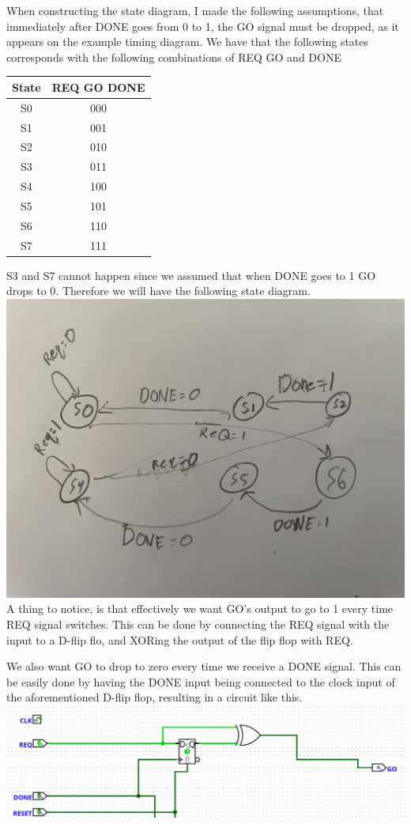 \documentclass[12pt]{article}
\begin{document}
When constructing the state diagram, I made the following assumptions,
that immediately after DONE goes from 0 to 1, the GO signal must be dropped,
as it appears on the example timing diagram. We have that the following states
corresponds with the following combinations of REQ GO and DONE \\
\begin{center}
    \begin{tabular}{c|c}
        State & REQ GO DONE\\
        \hline
        S0 & 000\\
\hline
S1 & 001\\
\hline
S2 & 010\\
\hline
S3 & 011\\
\hline
S4 & 100\\
\hline
S5 & 101\\
\hline
S6 & 110\\
\hline
S7 & 111\\
\hline
    \end{tabular}
\end{center}
S3 and S7 cannot happen since we assumed that when DONE goes to 1 GO drops to 0.
Therefore we will have the following state diagram.\\
\includegraphics[scale=0.25]{fig11.jpg}\\
A thing to notice, is that effectively we want GO's output to go to 1 every time 
REQ signal switches. This can be done by connecting the REQ signal with 
the input to a D-flip flo, and XORing the output of the flip flop with
REQ. 

We also want GO to drop to zero every time we receive a DONE signal. This can be 
easily done by having the DONE input being connected to the clock input of the
aforementioned D-flip flop, resulting in a circuit like this.\\
\includegraphics[scale=0.25]{fig12.png}\\
\end{document}
